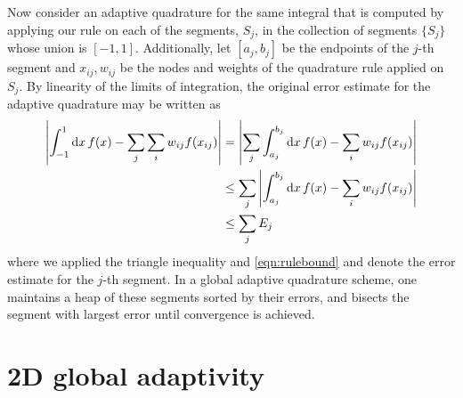 \documentclass{article}
\begin{document}
Now consider an adaptive quadrature for the same integral that is computed by
applying our rule on each of the segments, $S_j$, in the collection of segments
$\{S_j\}$ whose union is $[-1,1]$. Additionally, let $[a_j,b_j]$ be the
endpoints of the $j$-th segment and $x_{ij}, w_{ij}$ be the nodes and weights of
the quadrature rule applied on $S_j$. By linearity of the limits of integration, the
original error estimate for the adaptive quadrature may be written as
\begin{align}
    \abs{\int_{-1}^{1} \dd{x} f(x) - \sum_{j} \sum_{i} w_{ij} f(x_{ij})}
    &= \abs{\sum_j \int_{a_j}^{b_j} \dd{x} f(x) - \sum_{i} w_{ij} f(x_{ij})}
\\  &\leq \sum_j \abs{\int_{a_j}^{b_j} \dd{x} f(x) - \sum_{i} w_{ij} f(x_{ij})}
\\  &\leq \sum_j E_{j} \label{eqn:adaptbound}
\end{align}
where we applied the triangle inequality and \eqref{eqn:rulebound} and denote
the error estimate for the $j$-th segment. In a global adaptive quadrature
scheme, one maintains a heap of these segments sorted by their errors, and
bisects the segment with largest error until convergence is achieved.

\section{2D global adaptivity}
\end{document}
